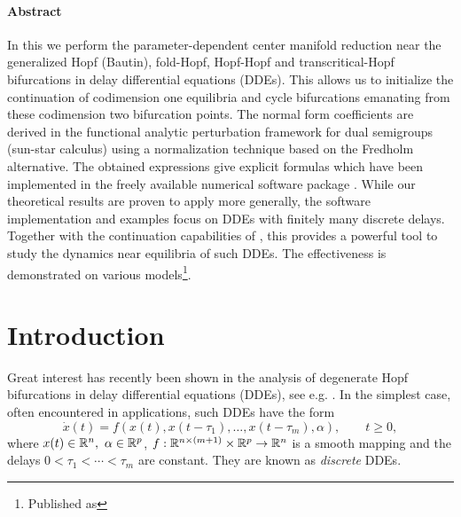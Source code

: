 \paragraph{{\color{header1}Abstract}} In this \paper{} we perform the
parameter-dependent center manifold reduction near the generalized Hopf
(Bautin), fold-Hopf, Hopf-Hopf and transcritical-Hopf bifurcations in delay
differential equations (DDEs). This allows us to initialize the continuation of
codimension one equilibria and cycle bifurcations emanating from these
codimension two bifurcation points. The normal form coefficients are derived in
the functional analytic perturbation framework for dual semigroups (sun-star
calculus) using a normalization technique based on the Fredholm alternative.
The obtained expressions give explicit formulas which have been implemented in
the freely available numerical software package \DDEBIFTOOL. While our
theoretical results are proven to apply more generally, the software
implementation and examples focus on DDEs with finitely many discrete delays.
Together with the continuation capabilities of \DDEBIFTOOL, this provides a
powerful tool to study the dynamics near equilibria of such DDEs. The
effectiveness is demonstrated on various models\footnote{Published as
}.

\section{Introduction}\label{switch:sec:introduction}
Great interest has recently been shown in the analysis of degenerate Hopf bifurcations in delay differential equations (DDEs), see e.g. \cite{MR2296886, MR3020901, Xu2010, MR2819829, Wang2010Hopftranscritical, Ma2011, MR3178278, MR2775253, qesmi2014HH, Agrawal2016, MR2889930, MR3047823, MR3342118, Peng2013, MR3146341, MR3430930, Song2009}.  In the simplest case, often encountered in applications, such DDEs have the form
%
\begin{equation}
  \label{switch:eq:discreteDDEs}
  \dot{x}(t)=f(x(t),x(t-\tau_1),\ldots,x(t-\tau_m),\alpha), \qquad t \geq 0,
\end{equation}
%
where  $x(t) \in \mathbb{R}^n,\ \alpha \in \mathbb{R}^p$, $f : \mathbb{R}^{n \times (m+1)} \times \mathbb{R}^p \to \mathbb{R}^n$ is a smooth mapping and the delays $0 < \tau_1 < \cdots <\tau_m$ are constant. They are known as \emph{discrete} DDEs.

